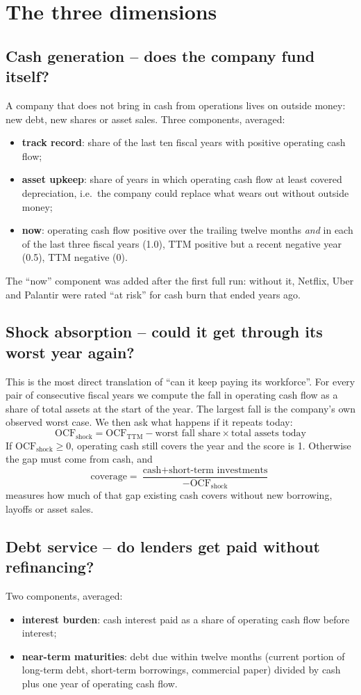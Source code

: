 \documentclass[11pt,a4paper]{article}
\begin{document}
\section{The three dimensions}

\subsection{Cash generation -- does the company fund itself?}
A company that does not bring in cash from operations lives on outside money: new debt, new shares or asset sales. Three components, averaged:
\begin{itemize}
  \item \textbf{track record}: share of the last ten fiscal years with positive operating cash flow;
  \item \textbf{asset upkeep}: share of years in which operating cash flow at least covered depreciation, i.e.\ the company could replace what wears out without outside money;
  \item \textbf{now}: operating cash flow positive over the trailing twelve months \emph{and} in each of the last three fiscal years (1.0), TTM positive but a recent negative year (0.5), TTM negative (0).
\end{itemize}
The ``now'' component was added after the first full run: without it, Netflix, Uber and Palantir were rated ``at risk'' for cash burn that ended years ago.

\subsection{Shock absorption -- could it get through its worst year again?}
This is the most direct translation of ``can it keep paying its workforce''. For every pair of consecutive fiscal years we compute the fall in operating cash flow as a share of total assets at the start of the year. The largest fall is the company's own observed worst case. We then ask what happens if it repeats today:
\[
\text{OCF}_{\text{shock}} = \text{OCF}_{\text{TTM}} - \text{worst fall share} \times \text{total assets today}
\]
If $\text{OCF}_{\text{shock}} \ge 0$, operating cash still covers the year and the score is 1. Otherwise the gap must come from cash, and
\[
\text{coverage} = \frac{\text{cash} + \text{short-term investments}}{-\text{OCF}_{\text{shock}}}
\]
measures how much of that gap existing cash covers without new borrowing, layoffs or asset sales.

\subsection{Debt service -- do lenders get paid without refinancing?}
Two components, averaged:
\begin{itemize}
  \item \textbf{interest burden}: cash interest paid as a share of operating cash flow before interest;
  \item \textbf{near-term maturities}: debt due within twelve months (current portion of long-term debt, short-term borrowings, commercial paper) divided by cash plus one year of operating cash flow.
\end{itemize}
\end{document}

